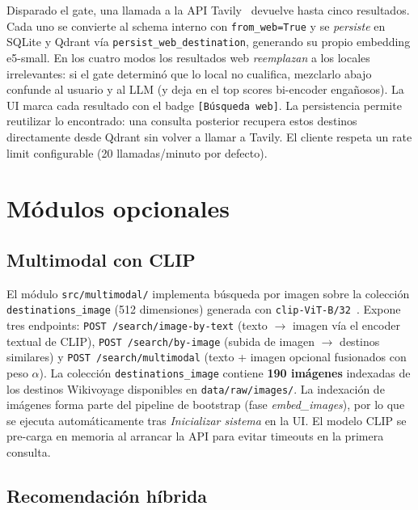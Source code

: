 \documentclass[runningheads,a4paper]{llncs}
\begin{document}
Disparado el gate, una llamada a la API Tavily~\cite{tavily} devuelve hasta cinco resultados. Cada uno se convierte al schema interno con \texttt{from\_web=True} y se \emph{persiste} en SQLite y Qdrant v\'ia \texttt{persist\_web\_destination}, generando su propio embedding e5-small. En los cuatro modos los resultados web \emph{reemplazan} a los locales irrelevantes: si el gate determin\'o que lo local no cualifica, mezclarlo abajo confunde al usuario y al LLM (y deja en el top scores bi-encoder enga\~nosos). La UI marca cada resultado con el badge \texttt{[B\'usqueda web]}. La persistencia permite reutilizar lo encontrado: una consulta posterior recupera estos destinos directamente desde Qdrant sin volver a llamar a Tavily. El cliente respeta un rate limit configurable (20 llamadas/minuto por defecto).

\section{M\'odulos opcionales}

\subsection{Multimodal con CLIP}

El m\'odulo \texttt{src/multimodal/} implementa b\'usqueda por imagen sobre la colecci\'on \texttt{destinations\_image} (512 dimensiones) generada con \texttt{clip-ViT-B/32}~\cite{radford2021clip}. Expone tres endpoints: \texttt{POST /search/image-by-text} (texto $\to$ imagen v\'ia el encoder textual de CLIP), \texttt{POST /search/by-image} (subida de imagen $\to$ destinos similares) y \texttt{POST /search/multimodal} (texto + imagen opcional fusionados con peso $\alpha$). La colecci\'on \texttt{destinations\_image} contiene \textbf{190 im\'agenes} indexadas de los destinos Wikivoyage disponibles en \texttt{data/raw/images/}. La indexaci\'on de im\'agenes forma parte del pipeline de bootstrap (fase \emph{embed\_images}), por lo que se ejecuta autom\'aticamente tras \emph{Inicializar sistema} en la UI. El modelo CLIP se pre-carga en memoria al arrancar la API para evitar timeouts en la primera consulta.

\subsection{Recomendaci\'on h\'ibrida}
\end{document}
